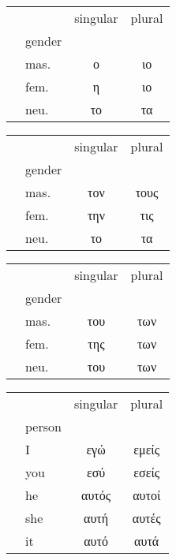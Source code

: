 \documentclass{article}
\newcommand{\articles}[7]{
    \begin{table}[htbp]
        \centering
        \begin{tabular}{llcc}
            \toprule
                &        & singular & plural \\
                & gender &          &        \\
            \midrule
            \multirow{3}{*}{\rotatebox{90}{#1.}}
                & mas.    & #2        & #5 \\
                & fem.    & #3        & #6 \\
                & neu.    & #4        & #7 \\
            \bottomrule
        \end{tabular}
    \end{table}
}
\newcommand{\pronouns}[11]{
    \begin{table}[htbp]
        \centering
        \begin{tabular}{llcc}
            \toprule
                &        & singular & plural \\
                & person &          &        \\
            \midrule
            \multirow{3}{*}{\rotatebox{90}{#1.}}
                & I      & #2        & #7 \\
                & you    & #3        & #8 \\
                & he     & #4        & #9 \\
                & she    & #5        & #10 \\
                & it     & #6        & #11 \\

            \bottomrule
        \end{tabular}
    \end{table}
}
\begin{document}
\articles{nom}{ο}   {η}   {το}  {ιο}  {ιο}  {τα}
\articles{acc}{τον} {την} {το}  {τους}{τις} {τα}
\articles{gen}{του} {της} {του} {των} {των} {των}
\pronouns{nom}{εγώ}{εσύ}{αυτός}{αυτή}{αυτό}{εμείς}{εσείς}{αυτοί}{αυτές}{αυτά}

\end{document}
